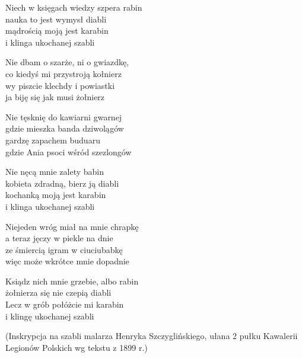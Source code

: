 \begin{text}
    Niech w księgach wiedzy szpera rabin\\
    nauka to jest wymysł diabli\\
    mądrością moją jest karabin\\
    i klinga ukochanej szabli

    Nie dbam o szarże, ni o gwiazdkę,\\
    co kiedyś mi przystroją kołnierz\\
    wy piszcie klechdy i powiastki\\
    ja biję się jak musi żołnierz

    Nie tęsknię do kawiarni gwarnej\\
    gdzie mieszka banda dziwolągów\\
    gardzę zapachem buduaru\\
    gdzie Ania psoci wśród szezlongów

    Nie nęcą mnie zalety babin\\
    kobieta zdradną, bierz ją diabli\\
    kochanką moją jest karabin\\
    i klinga ukochanej szabli

    Niejeden wróg miał na mnie chrapkę\\
    a teraz jęczy w piekle na dnie\\
    ze śmiercią igram w ciuciubabkę\\
    więc może wkrótce mnie dopadnie

    Ksiądz nich mnie grzebie, albo rabin\\
    żołnierza się nie czepią diabli\\
    Lecz w grób połóżcie mi karabin\\
    i klingę ukochanej szabli

    (Inskrypcja na szabli malarza Henryka Szczyglińskiego, ułana 2 pułku Kawalerii Legionów Polskich wg tekstu  z 1899 r.)

\end{text}
\begin{chord}

\end{chord}